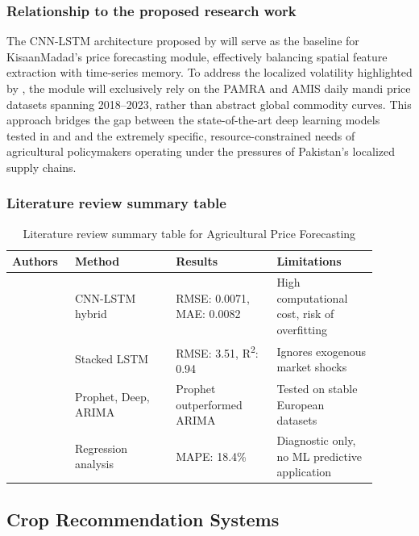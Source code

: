\subsubsection{Relationship to the proposed research work}
The CNN-LSTM architecture proposed by \cite{zhang2023agricultural} will serve as the baseline for KisaanMadad's price forecasting module, effectively balancing spatial feature extraction with time-series memory. To address the localized volatility highlighted by \cite{habib2021price}, the module will exclusively rely on the PAMRA and AMIS daily mandi price datasets spanning 2018--2023, rather than abstract global commodity curves. This approach bridges the gap between the state-of-the-art deep learning models tested in \cite{jadhav2021price} and \cite{menculini2021comparing} and the extremely specific, resource-constrained needs of agricultural policymakers operating under the pressures of Pakistan's localized supply chains.

\subsubsection{Literature review summary table}
\begin{table}[htbp]
  \centering
  \caption{Literature review summary table for Agricultural Price Forecasting}
  \label{tab:price_forecasting}
  \begin{tabular}{p{0.15\linewidth} p{0.25\linewidth} p{0.25\linewidth} p{0.25\linewidth}}
    \toprule
    \textbf{Authors} & \textbf{Method} & \textbf{Results} & \textbf{Limitations} \\
    \midrule
    \cite{zhang2023agricultural} & CNN-LSTM hybrid & RMSE: 0.0071, MAE: 0.0082 & High computational cost, risk of overfitting \\
    \cite{jadhav2021price} & Stacked LSTM & RMSE: 3.51, R\textsuperscript{2}: 0.94 & Ignores exogenous market shocks \\
    \cite{menculini2021comparing} & Prophet, Deep, ARIMA & Prophet outperformed ARIMA & Tested on stable European datasets \\
    \cite{habib2021price} & Regression analysis & MAPE: 18.4\% & Diagnostic only, no ML predictive application \\
    \bottomrule
  \end{tabular}
\end{table}

\subsection{Crop Recommendation Systems}

